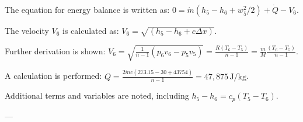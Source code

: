 The equation for energy balance is written as:  
\( 0 = \dot{m} (h_5 - h_6 + w_5^2 / 2) + \dot{Q} - V_6 \).  

The velocity \( V_6 \) is calculated as:  
\( V_6 = \sqrt{(h_5 - h_6 + c \Delta x)} \).  

Further derivation is shown:  
\( V_6 = \sqrt{\frac{1}{n - 1} (p_6 v_6 - p_5 v_5)} = \frac{R (T_6 - T_5)}{n - 1} = \frac{\dot{m}}{M} \frac{(T_6 - T_5)}{n - 1} \).  

A calculation is performed:  
\( Q = \frac{2 \dot{m} c (273.15 - 30 + 43754)}{n - 1} = 47,875 \, \text{J/kg} \).  

Additional terms and variables are noted, including \( h_5 - h_6 = c_p (T_5 - T_6) \).

---